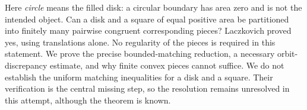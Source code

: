 Here \emph{circle} means the filled disk: a circular boundary has area zero and is not the intended object. Can a disk and a square of equal positive area be partitioned into finitely many pairwise congruent corresponding pieces? Laczkovich proved yes, using translations alone. No regularity of the pieces is required in this statement.
We prove the precise bounded-matching reduction, a necessary orbit-discrepancy estimate, and why finite convex pieces cannot suffice. We do not establish the uniform matching inequalities for a disk and a square. Their verification is the central missing step, so the resolution remains unresolved in this attempt, although the theorem is known.
